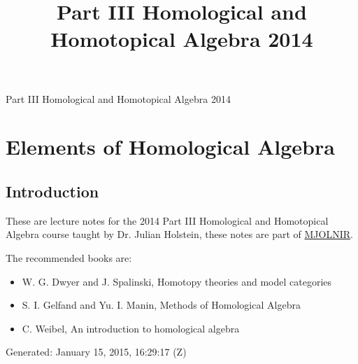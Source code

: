 \documentclass[10pt,]{book}
\title{Part III Homological and Homotopical Algebra 2014}
\author{}
\date{}
\theoremstyle{plain}
\theoremstyle{definition}
\numberwithin{equation}{section}
\begin{document}
\frontmatter
\thispagestyle{empty}
\begin{center}
{\Huge Part III Homological and Homotopical Algebra 2014}
\end{center}\par
{}
\clearpage
\thispagestyle{empty}
\clearpage
\maketitle
\clearpage
\thispagestyle{empty}
\clearpage
\setcounter{tocdepth}{1}
\renewcommand*\contentsname{Contents}
\tableofcontents
\mainmatter
\typeout{************************************************}
\typeout{************************************************}
\chapter[Elements of Homological Algebra]{Elements of Homological Algebra}\label{chap-hom-alg}
\typeout{************************************************}
\typeout{************************************************}
\section[Introduction]{Introduction}\label{sec-introduction}
These are lecture notes for the 2014 Part III Homological and Homotopical Algebra course taught by Dr. Julian Holstein, these notes are part of \href{https://alexjbest.github.io/mjolnir/}{MJOLNIR}.%
\par
The recommended books are: 
          \begin{itemize}
\item{}W. G. Dwyer and J. Spalinski, Homotopy theories and model categories\item{}S. I. Gelfand and Yu. I. Manin, Methods of Homological Algebra\item{}C. Weibel, An introduction to homological algebra\end{itemize}

\par

          Generated: January 15, 2015, 16:29:17 (Z)
\typeout{************************************************}
\typeout{************************************************}
\end{document}
